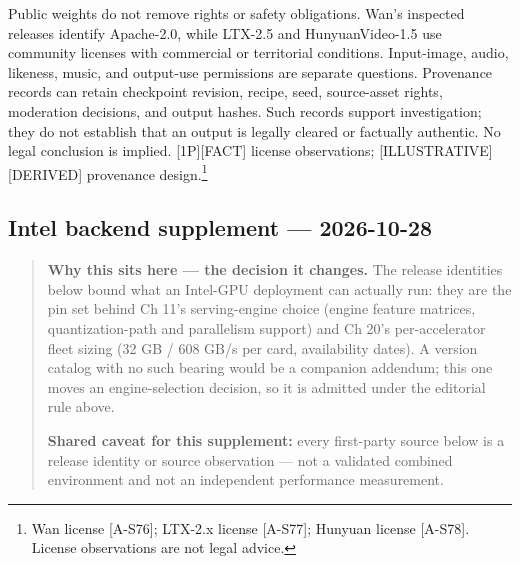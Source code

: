 Public weights do not remove rights or safety obligations. Wan's
inspected releases identify Apache-2.0, while LTX-2.5 and
HunyuanVideo-1.5 use community licenses with commercial or territorial
conditions. Input-image, audio, likeness, music, and output-use
permissions are separate questions. Provenance records can retain
checkpoint revision, recipe, seed, source-asset rights, moderation
decisions, and output hashes. Such records support investigation; they
do not establish that an output is legally cleared or factually
authentic. No legal conclusion is implied. \mbox{{[}1P{]}}\hspace{0pt}\mbox{{[}FACT{]}} license
observations; \mbox{{[}ILLUSTRATIVE{]}}\hspace{0pt}\mbox{{[}DERIVED{]}} provenance
design.\footnote{Wan license \mbox{{[}A-S76{]}}; LTX-2.x license \mbox{{[}A-S77{]}};
  Hunyuan license \mbox{{[}A-S78{]}}. License observations are not legal
  advice.}

\subsection*{Intel backend supplement ---
2026-10-28}\label{intel-backend-supplement-2026-10-28}

\begin{quote}
\textbf{Why this sits here --- the decision it changes.} The release
identities below bound what an Intel-GPU deployment can actually run:
they are the pin set behind Ch 11's serving-engine choice (engine
feature matrices, quantization-path and parallelism support) and Ch 20's
per-accelerator fleet sizing (32 GB / 608 GB/s per card, availability
dates). A version catalog with no such bearing would be a companion
addendum; this one moves an engine-selection decision, so it is admitted
under the editorial rule above.

\textbf{Shared caveat for this supplement:} every first-party source
below is a release identity or source observation --- not a validated
combined environment and not an independent performance measurement.
\end{quote}

